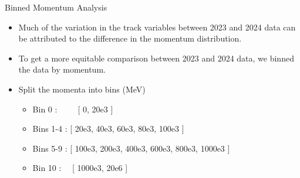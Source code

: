 \begin{frame}{Binned Momentum Analysis}
    \begin{itemize}
        \item Much of the variation in the track variables between 2023 and 2024 data can be attributed to the difference in the momentum distribution.
        \item To get a more equitable comparison between 2023 and 2024 data, we binned the data by momentum.
        \item Split the momenta into bins (MeV)
        \begin{itemize}
            \item Bin 0 :\ \ \ \ \   [ 0, 20e3 ]
            \item Bins 1-4 : [ 20e3, 40e3, 60e3, 80e3, 100e3 ]
            \item Bins 5-9 :   [ 100e3, 200e3, 400e3, 600e3, 800e3, 1000e3 ]
            \item Bin 10 : \ \ [ 1000e3, 20e6 ]
        \end{itemize}
    \end{itemize}
\end{frame}

